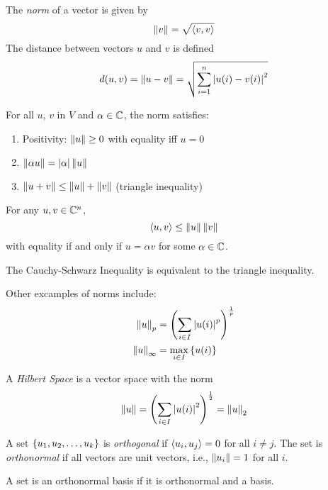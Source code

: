 \begin{definition}
    The \emph{norm} of a vector is given by
    \[\left\lVert v\right\rVert = \sqrt{\left\langle v, v\right\rangle}\]
    The distance between vectors $u$ and $v$ is defined
    \[d(u, v) = \left\lVert u - v\right\rVert = \sqrt{\sum_{i=1}^n\left\lvert u(i) - v(i)\right\rvert^2}\]
\end{definition}

\begin{theorem}
    For all $u$, $v$ in $V$ and $\alpha \in \mathbb{C}$, the norm satisfies:
    \begin{enumerate}[label=\arabic*.]
        \item Positivity: $\left\lVert u\right\rVert \geq 0$ with equality iff $u = 0$
        \item $\left\lVert\alpha u\right\rVert = \left\lvert\alpha\right\rvert\left\lVert u\right\rVert$
        \item $\left\lVert u + v\right\rVert \leq \left\lVert u\right\rVert + \left\lVert v\right\rVert$ (triangle inequality)
    \end{enumerate}
\end{theorem}

\begin{theorem}
    For any $u, v \in \mathbb{C}^n$,
    \[\left\langle u, v\right\rangle \leq \left\lVert u\right\rVert\left\lVert v\right\rVert\]
    with equality if and only if $u = \alpha v$ for some $\alpha \in \mathbb{C}$.
\end{theorem}

The Cauchy-Schwarz Inequality is equivalent to the triangle inequality.

Other excamples of norms include:
\begin{align*}
    \left\lVert u\right\rVert_p        & = \left(\sum_{i\in I}\left\lvert u(i)\right\rvert^p\right)^{\frac{1}{p}} \\
    \left\lVert u\right\rVert_{\infty} & = \underset{i\in I}{\max}\left\lbrace u(i)\right\rbrace
\end{align*}

\begin{definition}
    A \emph{Hilbert Space} is a vector space with the norm
    \[\left\lVert u\right\rVert = \left(\sum_{i\in I}\left\lvert u(i)\right\rvert^2\right)^{\frac{1}{2}} = \left\lVert u\right\rVert_2\]
\end{definition}

\begin{definition}
    A set $\left\lbrace u_1, u_2, \dots, u_k\right\rbrace$ is \emph{orthogonal} if $\left\langle u_i, u_j\right\rangle = 0$
    for all $i \neq j$. The set is \emph{orthonormal} if all vectors are unit vectors,
    i.e., $\left\lVert u_i\right\rVert = 1$ for all $i$.

    A set is an orthonormal basis if it is orthonormal and a basis.
\end{definition}

